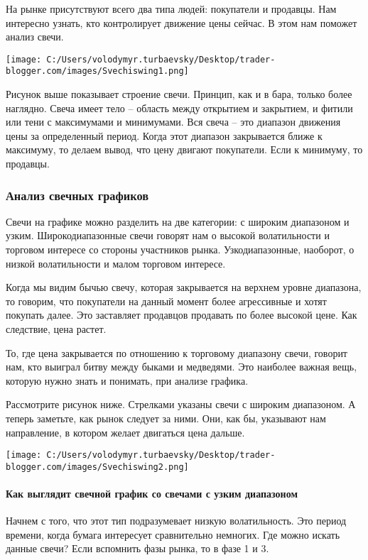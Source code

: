 \documentclass[a5paper]{article}
\begin{document}
На рынке присутствуют всего два типа людей: покупатели и продавцы. Нам
интересно узнать, кто контролирует движение цены сейчас. В этом нам
поможет анализ свечи.

\texttt{[image: C:/Users/volodymyr.turbaevsky/Desktop/trader-blogger.com/images/Svechiswing1.png]}

Рисунок выше показывает строение свечи. Принцип, как и в бара, только
более наглядно. Свеча имеет тело – область между открытием и
закрытием, и фитили или тени с максимумами и минимумами. Вся свеча –
это диапазон движения цены за определенный период. Когда этот диапазон
закрывается ближе к максимуму, то делаем вывод, что цену двигают
покупатели. Если к минимуму, то продавцы.

\subsubsection{Анализ свечных графиков}

Свечи на графике можно разделить на две категории: с широким диапазоном и узким. Широкодиапазонные свечи говорят нам о высокой волатильности и торговом интересе со стороны участников рынка. Узкодиапазонные, наоборот, о низкой волатильности и малом торговом интересе.

Когда мы видим бычью свечу, которая закрывается на верхнем уровне диапазона, то говорим, что покупатели на данный момент более агрессивные и хотят покупать далее. Это заставляет продавцов продавать по более высокой цене. Как следствие, цена растет.

То, где цена закрывается по отношению к торговому диапазону свечи, говорит нам, кто выиграл битву между быками и медведями. Это наиболее важная вещь, которую нужно знать и понимать, при анализе графика.

Рассмотрите рисунок ниже. Стрелками указаны свечи с широким
диапазоном. А теперь заметьте, как рынок следует за ними. Они, как бы,
указывают нам направление, в котором желает двигаться цена дальше.

\texttt{[image: C:/Users/volodymyr.turbaevsky/Desktop/trader-blogger.com/images/Svechiswing2.png]}

\paragraph{Как выглядит свечной график со свечами с узким диапазоном}

Начнем с того, что этот тип подразумевает низкую волатильность. Это период времени, когда бумага интересует сравнительно немногих. Где можно искать данные свечи? Если вспомнить фазы рынка, то в фазе 1 и 3.
\end{document}
